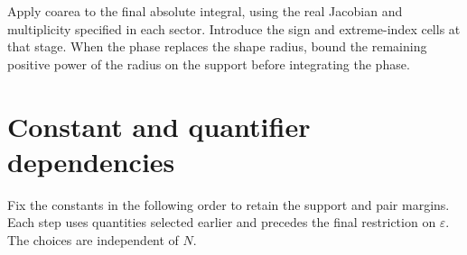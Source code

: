 \documentclass[11pt]{article}
\numberwithin{equation}{section}
\theoremstyle{definition}
\newcommand{\eps}{\varepsilon}
\begin{document}
Apply coarea to the final absolute integral, using the real Jacobian
and multiplicity specified in each sector. Introduce the sign and
extreme-index cells at that stage. When the phase replaces the shape
radius, bound the remaining positive power of the radius on the
support before integrating the phase.



\section{Constant and quantifier dependencies}\label{app:constants}

Fix the constants in the following order to retain the support and
pair margins. Each step uses quantities selected earlier and precedes
the final restriction on \(\eps\). The choices are independent of \(N\).
\end{document}
